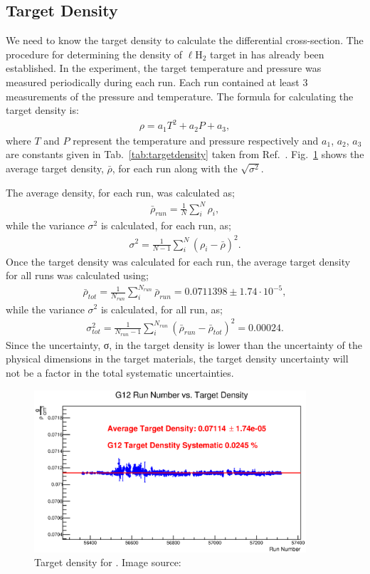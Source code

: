 \subsection{Target Density}\label{sec:analysis.target_density}

We need to know the target density to calculate the differential cross-section. The procedure for determining the density of $\ell$H$_2$ target in  has already been established\cite{clas.target.density}. In the  experiment, the target temperature and pressure was measured periodically during each run. Each run contained at least 3 measurements of the pressure and temperature. The formula for calculating the target density is:
\begin{align}
\rho = a_1 T^2 + a_2 P + a_3,
\label{eq:target_density}
\end{align}
where $T$ and $P$ represent the temperature and pressure respectively and $a_1$, $a_2$, $a_3$ are constants given in Tab.~\ref{tab:targetdensity} taken from Ref.~\cite{clas.target.density}. Fig.~\ref{fig:target_density} shows the average target density, $\bar \rho$, for each run along with the $\sqrt{\sigma^2}$.

The average density, for each run, was calculated as;
\begin{align}
\bar \rho_{run} = \frac{1}{N}\sum_i^N \rho_i,
\end{align}
while the variance $\sigma^2$ is calculated, for each run, as;
\begin{align}
\sigma^2 = \frac{1}{N - 1}\sum_i^N (\rho_i - \bar \rho)^2.
\end{align}
Once the target density was calculated for each run, the average target density for all  runs was calculated using;
\begin{align}
\bar \rho_{tot} = \frac{1}{N_{run}}\sum_i^{N_{run}} \bar \rho_{run} = 0.0711398 \pm 1.74 \cdot10^{-5},
\end{align}
while the variance $\sigma^2$ is calculated, for all  run, as;
\begin{align}
\sigma_{tot}^2 = \frac{1}{N_{run} -1}\sum_i^{N_{run}} (\bar \rho_{run} - \bar \rho_{tot})^2 = 0.00024.
\end{align}
Since the uncertainty, σ, in the target density is lower than the uncertainty of the physical dimensions in the target materials, the target density uncertainty will not be a factor in the total systematic uncertainties.

\begin{figure}[htpb]\begin{center}
\includegraphics[width=0.9\textwidth]{figures/calib/targ/G12_Target_Density.eps}
\caption[Target density for ]{\label{fig:target_density}Target density for . Image source:~\cite{clas.thesis.kunkel}}
\end{center}\end{figure}
\FloatBarrier
